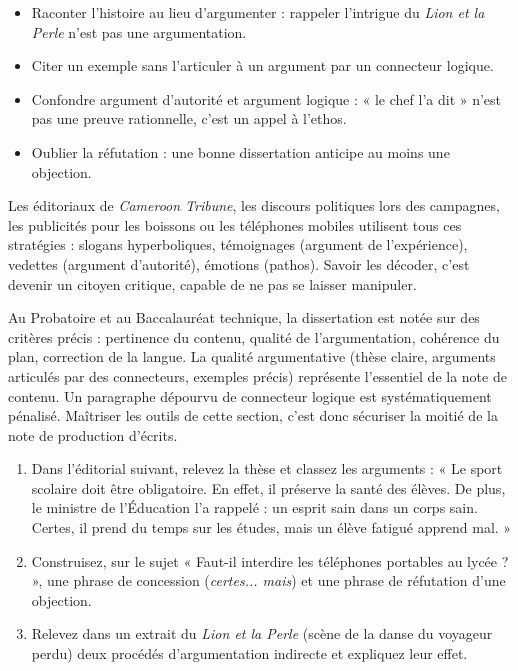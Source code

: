 \documentclass[11pt]{article}
\begin{document}
\begin{attention}
\begin{itemize}
\item Raconter l'histoire au lieu d'argumenter : rappeler l'intrigue du \emph{Lion et la Perle} n'est pas une argumentation.
\item Citer un exemple sans l'articuler à un argument par un connecteur logique.
\item Confondre argument d'autorité et argument logique : « le chef l'a dit » n'est pas une preuve rationnelle, c'est un appel à l'ethos.
\item Oublier la réfutation : une bonne dissertation anticipe au moins une objection.
\end{itemize}
\end{attention}

\begin{savaistu}
Les éditoriaux de \emph{Cameroon Tribune}, les discours politiques lors des campagnes, les publicités pour les boissons ou les téléphones mobiles utilisent tous ces stratégies : slogans hyperboliques, témoignages (argument de l'expérience), vedettes (argument d'autorité), émotions (pathos). Savoir les décoder, c'est devenir un citoyen critique, capable de ne pas se laisser manipuler.
\end{savaistu}

\begin{exemplebox}
Au Probatoire et au Baccalauréat technique, la dissertation est notée sur des critères précis : pertinence du contenu, qualité de l'argumentation, cohérence du plan, correction de la langue. La qualité argumentative (thèse claire, arguments articulés par des connecteurs, exemples précis) représente l'essentiel de la note de contenu. Un paragraphe dépourvu de connecteur logique est systématiquement pénalisé. Maîtriser les outils de cette section, c'est donc sécuriser la moitié de la note de production d'écrits.
\end{exemplebox}

\begin{exercice}
\begin{enumerate}
\item Dans l'éditorial suivant, relevez la thèse et classez les arguments : « Le sport scolaire doit être obligatoire. En effet, il préserve la santé des élèves. De plus, le ministre de l'Éducation l'a rappelé : un esprit sain dans un corps sain. Certes, il prend du temps sur les études, mais un élève fatigué apprend mal. »
\item Construisez, sur le sujet « Faut-il interdire les téléphones portables au lycée ? », une phrase de concession (\emph{certes... mais}) et une phrase de réfutation d'une objection.
\item Relevez dans un extrait du \emph{Lion et la Perle} (scène de la danse du voyageur perdu) deux procédés d'argumentation indirecte et expliquez leur effet.
\end{enumerate}
\end{exercice}
\end{document}
